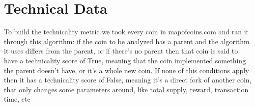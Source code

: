\section{Technical Data}
To build the technicality metric we took every coin in mapofcoins.com and ran it through this algorithm: if the coin to be analyzed has a parent and the algorithm it uses differs from the parent, or if there's no parent then that coin is said to have a technicality score of True, meaning that the coin implemented something the parent doesn't have, or it's a whole new coin. If none of this conditions apply then it has a technicality score of False, meaning it's a direct fork of another coin, that only changes some parameters around, like total supply, reward, transaction time, etc

